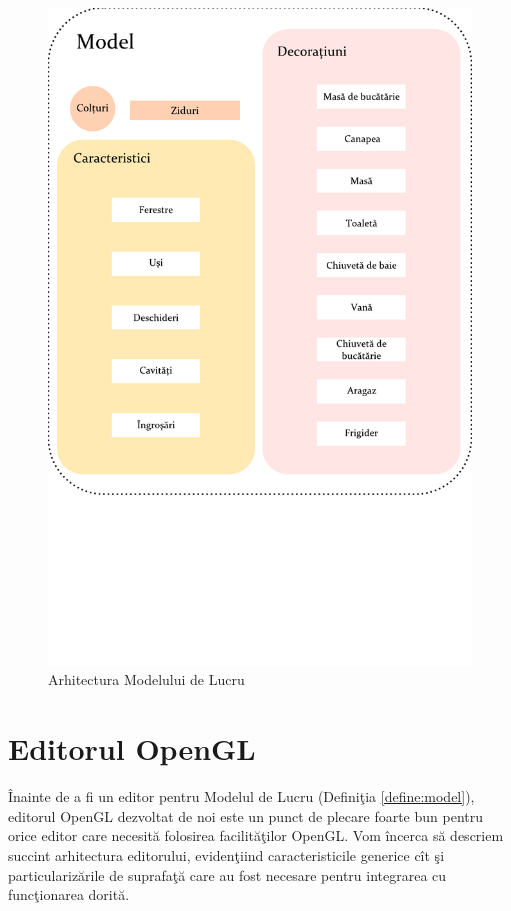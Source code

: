 \begin{figure}[htp]
\begin{center} 
\includegraphics[width=\textwidth]{figures/drawing.pdf}
  \caption{Arhitectura 
Modelului de Lucru}
  \label{figure:model-arh}
\end{center}
\end{figure}


\section{Editorul OpenGL}

Înainte de a fi un editor pentru Modelul de Lucru (Definiţia 
\ref{define:model}), editorul OpenGL dezvoltat de noi este un punct de plecare 
foarte bun pentru orice editor care necesită folosirea facilităţilor OpenGL. 
Vom încerca să descriem succint arhitectura editorului, evidenţiind 
caracteristicile generice cît şi particularizările de suprafaţă care au fost 
necesare pentru integrarea cu funcţionarea dorită.

